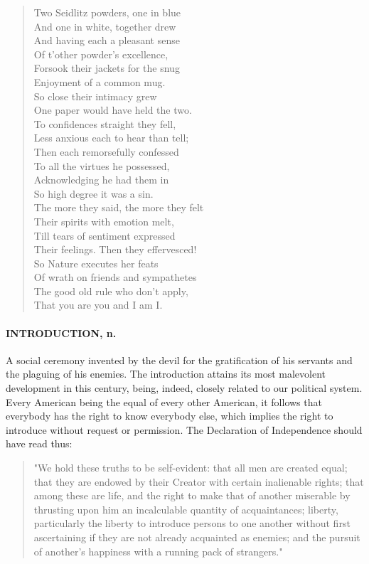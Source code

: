 \documentclass[11pt]{article}
\begin{document}
\begin{quote}   Two Seidlitz powders, one in blue \\
  And one in white, together drew \\
  And having each a pleasant sense \\
  Of t'other powder's excellence, \\
  Forsook their jackets for the snug \\
  Enjoyment of a common mug. \\
  So close their intimacy grew \\
  One paper would have held the two. \\
  To confidences straight they fell, \\
  Less anxious each to hear than tell; \\
  Then each remorsefully confessed \\
  To all the virtues he possessed, \\
  Acknowledging he had them in \\
  So high degree it was a sin. \\
  The more they said, the more they felt \\
  Their spirits with emotion melt, \\
  Till tears of sentiment expressed \\
  Their feelings.  Then they effervesced! \\
  So Nature executes her feats \\
  Of wrath on friends and sympathetes \\
  The good old rule who don't apply, \\
  That you are you and I am I.  \end{quote}

\paragraph{INTRODUCTION, n.}  A social ceremony invented by the devil for the
gratification of his servants and the plaguing of his enemies.  The
introduction attains its most malevolent development in this century,
being, indeed, closely related to our political system.  Every
American being the equal of every other American, it follows that
everybody has the right to know everybody else, which implies the
right to introduce without request or permission.  The Declaration of
Independence should have read thus:

\begin{quote}       "We hold these truths to be self-evident:  that all men are
  created equal; that they are endowed by their Creator with certain 
  inalienable rights; that among these are life, and the right to 
  make that of another miserable by thrusting upon him an 
  incalculable quantity of acquaintances; liberty, particularly the 
  liberty to introduce persons to one another without first 
  ascertaining if they are not already acquainted as enemies; and 
  the pursuit of another's happiness with a running pack of 
  strangers."  \end{quote}
\end{document}
